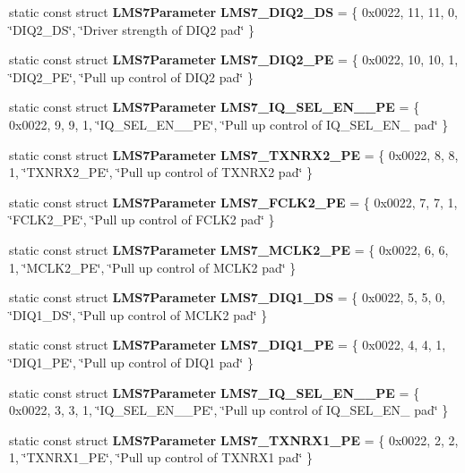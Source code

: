 \begin{DoxyCompactItemize}
static const struct {\bf L\+M\+S7\+Parameter} {\bf L\+M\+S7\+\_\+\+D\+I\+Q2\+\_\+\+DS} = \{ 0x0022, 11, 11, 0, \char`\"{}\+D\+I\+Q2\+\_\+\+D\+S\char`\"{}, \char`\"{}\+Driver strength of D\+I\+Q2 pad\char`\"{} \}
\item 
static const struct {\bf L\+M\+S7\+Parameter} {\bf L\+M\+S7\+\_\+\+D\+I\+Q2\+\_\+\+PE} = \{ 0x0022, 10, 10, 1, \char`\"{}\+D\+I\+Q2\+\_\+\+P\+E\char`\"{}, \char`\"{}\+Pull up control of D\+I\+Q2 pad\char`\"{} \}
\item 
static const struct {\bf L\+M\+S7\+Parameter} {\bf L\+M\+S7\+\_\+\+I\+Q\+\_\+\+S\+E\+L\+\_\+\+E\+N\+\_\+\_\+\+PE} = \{ 0x0022, 9, 9, 1, \char`\"{}\+I\+Q\+\_\+\+S\+E\+L\+\_\+\+E\+N\+\_\+\_\+\+P\+E\char`\"{}, \char`\"{}\+Pull up control of I\+Q\+\_\+\+S\+E\+L\+\_\+\+E\+N\+\_ pad\char`\"{} \}
\item 
static const struct {\bf L\+M\+S7\+Parameter} {\bf L\+M\+S7\+\_\+\+T\+X\+N\+R\+X2\+\_\+\+PE} = \{ 0x0022, 8, 8, 1, \char`\"{}\+T\+X\+N\+R\+X2\+\_\+\+P\+E\char`\"{}, \char`\"{}\+Pull up control of T\+X\+N\+R\+X2 pad\char`\"{} \}
\item 
static const struct {\bf L\+M\+S7\+Parameter} {\bf L\+M\+S7\+\_\+\+F\+C\+L\+K2\+\_\+\+PE} = \{ 0x0022, 7, 7, 1, \char`\"{}\+F\+C\+L\+K2\+\_\+\+P\+E\char`\"{}, \char`\"{}\+Pull up control of F\+C\+L\+K2 pad\char`\"{} \}
\item 
static const struct {\bf L\+M\+S7\+Parameter} {\bf L\+M\+S7\+\_\+\+M\+C\+L\+K2\+\_\+\+PE} = \{ 0x0022, 6, 6, 1, \char`\"{}\+M\+C\+L\+K2\+\_\+\+P\+E\char`\"{}, \char`\"{}\+Pull up control of M\+C\+L\+K2 pad\char`\"{} \}
\item 
static const struct {\bf L\+M\+S7\+Parameter} {\bf L\+M\+S7\+\_\+\+D\+I\+Q1\+\_\+\+DS} = \{ 0x0022, 5, 5, 0, \char`\"{}\+D\+I\+Q1\+\_\+\+D\+S\char`\"{}, \char`\"{}\+Pull up control of M\+C\+L\+K2 pad\char`\"{} \}
\item 
static const struct {\bf L\+M\+S7\+Parameter} {\bf L\+M\+S7\+\_\+\+D\+I\+Q1\+\_\+\+PE} = \{ 0x0022, 4, 4, 1, \char`\"{}\+D\+I\+Q1\+\_\+\+P\+E\char`\"{}, \char`\"{}\+Pull up control of D\+I\+Q1 pad\char`\"{} \}
\item 
static const struct {\bf L\+M\+S7\+Parameter} {\bf L\+M\+S7\+\_\+\+I\+Q\+\_\+\+S\+E\+L\+\_\+\+E\+N\+\_\+\_\+\+PE} = \{ 0x0022, 3, 3, 1, \char`\"{}\+I\+Q\+\_\+\+S\+E\+L\+\_\+\+E\+N\+\_\+\_\+\+P\+E\char`\"{}, \char`\"{}\+Pull up control of I\+Q\+\_\+\+S\+E\+L\+\_\+\+E\+N\+\_ pad\char`\"{} \}
\item 
static const struct {\bf L\+M\+S7\+Parameter} {\bf L\+M\+S7\+\_\+\+T\+X\+N\+R\+X1\+\_\+\+PE} = \{ 0x0022, 2, 2, 1, \char`\"{}\+T\+X\+N\+R\+X1\+\_\+\+P\+E\char`\"{}, \char`\"{}\+Pull up control of T\+X\+N\+R\+X1 pad\char`\"{} \}

\end{DoxyCompactItemize}
